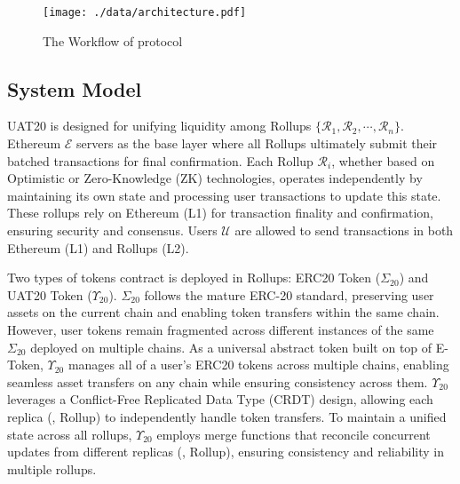

\begin{figure*}[h!]
\centering
\texttt{[image: ./data/architecture.pdf]}
\caption{\label{fig:arch} The Workflow of \tool protocol}
\end{figure*}
 

\subsection{System Model}

 UAT20 is designed for unifying liquidity among Rollups $\{\mathcal{R}_1, \mathcal{R}_2, \cdots, \mathcal{R}_n\}$. Ethereum $\mathcal{E}$ servers as the base layer where all Rollups ultimately submit their batched transactions for final confirmation. Each Rollup $\mathcal{R}_i$, whether based on Optimistic or Zero-Knowledge (ZK) technologies, operates independently by maintaining its own state and processing user transactions to update this state. These rollups rely on Ethereum (L1) for transaction finality and confirmation, ensuring security and consensus.
Users $\mathcal{U}$ are allowed to send transactions in both Ethereum (L1) and Rollups (L2).

 Two types of tokens contract is deployed in Rollups: ERC20 Token ($\Sigma_{20}$) and UAT20 Token ($\Upsilon_{20}$).
$\Sigma_{20}$ follows the mature ERC-20 standard, preserving user assets on the current chain and enabling token transfers within the same chain. However, user tokens remain fragmented across different instances of the same $\Sigma_{20}$ deployed on multiple chains.
As a universal abstract token built on top of E-Token, $\Upsilon_{20}$
  manages all of a user's ERC20 tokens across multiple chains, enabling seamless asset transfers on any chain while ensuring consistency across them. $\Upsilon_{20}$ leverages a Conflict-Free Replicated Data Type (CRDT) design, allowing each replica (\ie, Rollup) to independently handle token transfers. To maintain a unified state across all rollups, $\Upsilon_{20}$ employs merge functions that reconcile concurrent updates from different replicas (\ie, Rollup), ensuring consistency and reliability in multiple rollups.

